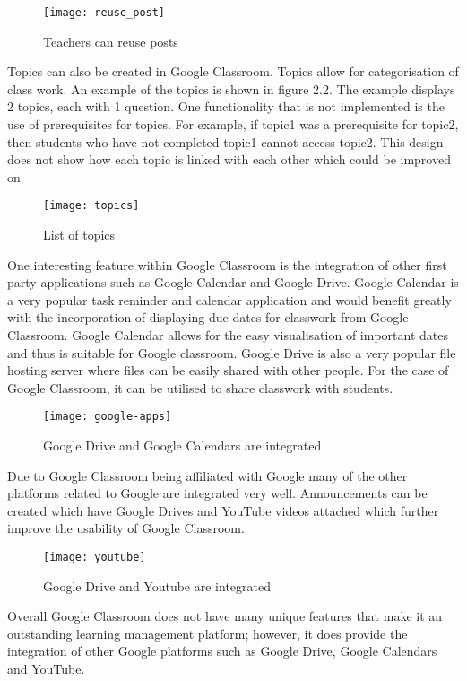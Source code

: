 \begin{figure}[h]
    \centering
    \texttt{[image: reuse\_post]}
    \caption{Teachers can reuse posts}
\end{figure}

Topics can also be created in Google Classroom.
Topics allow for categorisation of class work. 
An example of the topics is shown in figure 2.2. 
The example displays 2 topics, each with 1 question. 
One functionality that is not implemented is the use of prerequisites for topics. 
For example, if topic1 was a prerequisite for topic2, then students who have not completed topic1 cannot access topic2. 
This design does not show how each topic is linked with each other which could be improved on.

\begin{figure}[h]
    \centering
    \texttt{[image: topics]}
    \caption{List of topics}
\end{figure}

One interesting feature within Google Classroom is the integration of other first party applications such as Google Calendar and Google Drive. 
Google Calendar is a very popular task reminder and calendar application and would benefit greatly with the incorporation of displaying due dates for classwork from Google Classroom. 
Google Calendar allows for the easy visualisation of important dates and thus is suitable for Google classroom. 
Google Drive is also a very popular file hosting server where files can be easily shared with other people. 
For the case of Google Classroom, it can be utilised to share classwork with students.

\begin{figure}[h]
    \centering
    \texttt{[image: google-apps]}
    \caption{Google Drive and Google Calendars are integrated}
\end{figure}

Due to Google Classroom being affiliated with Google many of the other platforms related to Google are integrated very well. 
Announcements can be created which have Google Drives and YouTube videos attached which further improve the usability of Google Classroom.

\begin{figure}[h]
    \centering
    \texttt{[image: youtube]}
    \caption{Google Drive and Youtube are integrated}
\end{figure}

Overall Google Classroom does not have many unique features that make it an outstanding learning management platform; however, it does provide the integration of other Google platforms such as Google Drive, Google Calendars and YouTube.
